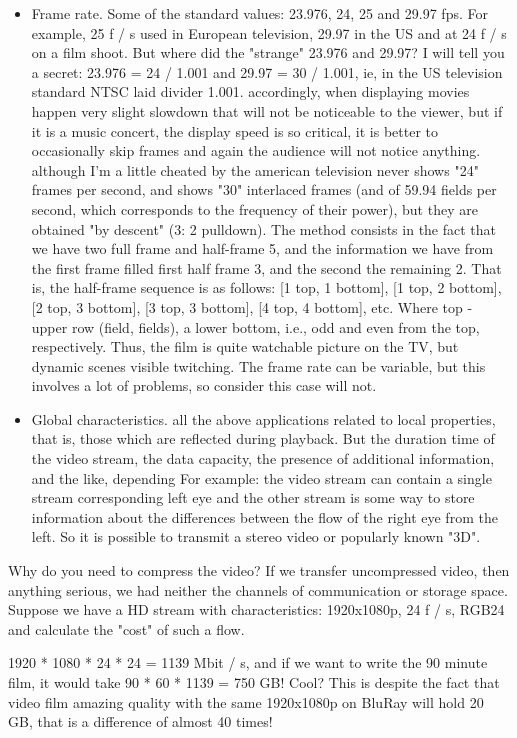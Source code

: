 \begin{itemize}
\item Frame rate. Some of the standard values: 23.976, 24, 25 and 29.97 fps. For example, 25 f / s used in European television, 29.97 in the US and at 24 f / s on a film shoot. But where did the "strange" 23.976 and 29.97? I will tell you a secret: 23.976 = 24 / 1.001 and 29.97 = 30 / 1.001, ie, in the US television standard NTSC laid divider 1.001. accordingly, when displaying movies happen very slight slowdown that will not be noticeable to the viewer, but if it is a music concert, the display speed is so critical, it is better to occasionally skip frames and again the audience will not notice anything. although I'm a little cheated by the american television never shows "24" frames per second, and shows "30" interlaced frames (and of 59.94 fields per second, which corresponds to the frequency of their power), but they are obtained "by descent" (3: 2 pulldown). The method consists in the fact that we have two full frame and half-frame 5, and the information we have from the first frame filled first half frame 3, and the second the remaining 2. That is, the half-frame sequence is as follows: [1 top, 1 bottom], [1 top, 2 bottom], [2 top, 3 bottom], [3 top, 3 bottom], [4 top, 4 bottom], etc. Where top - upper row (field, fields), a lower bottom, i.e., odd and even from the top, respectively. Thus, the film is quite watchable picture on the TV, but dynamic scenes visible twitching. The frame rate can be variable, but this involves a lot of problems, so consider this case will not.
\item Global characteristics. all the above applications related to local properties, that is, those which are reflected during playback. But the duration time of the video stream, the data capacity, the presence of additional information, and the like, depending For example: the video stream can contain a single stream corresponding left eye and the other stream is some way to store information about the differences between the flow of the right eye from the left. So it is possible to transmit a stereo video or popularly known "3D".
\end{itemize}

Why do you need to compress the video? If we transfer uncompressed video, then anything serious, we had neither the channels of communication or storage space. Suppose we have a HD stream with characteristics: 1920x1080p, 24 f / s, RGB24 and calculate the "cost" of such a flow.

1920 * 1080 * 24 * 24 = 1139 Mbit / s, and if we want to write the 90 minute film, it would take 90 * 60 * 1139 = 750 GB! Cool? This is despite the fact that video film amazing quality with the same 1920x1080p on BluRay will hold 20 GB, that is a difference of almost 40 times!

